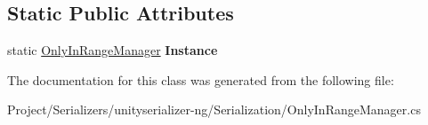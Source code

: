 \subsection*{Static Public Attributes}
\begin{DoxyCompactItemize}
\item 
\mbox{\label{class_only_in_range_manager_a5346a88bc972360dc7874ebea7d5bee4}} 
static \hyperlink{class_only_in_range_manager}{Only\+In\+Range\+Manager} {\bfseries Instance}
\end{DoxyCompactItemize}


The documentation for this class was generated from the following file\+:\begin{DoxyCompactItemize}
\item 
Project/\+Serializers/unityserializer-\/ng/\+Serialization/Only\+In\+Range\+Manager.\+cs\end{DoxyCompactItemize}
